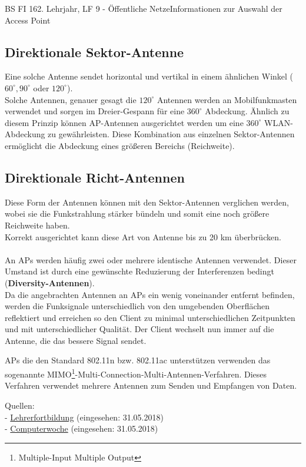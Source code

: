 \documentclass[11pt,twocolumn,oneside,openany,headings=optiontotoc,11pt,numbers=noenddot]{article}
\begin{document}
\begin{worksheet}{BS FI 16}{2. Lehrjahr, LF 9 - Öffentliche Netze}{Informationen zur Auswahl der Access Point}
		\subsection*{Direktionale Sektor-Antenne} Eine solche Antenne sendet horizontal und vertikal in einem ähnlichen Winkel (\(60^\circ, 90^\circ\) oder \(120^\circ\)).\\
		Solche Antennen, genauer gesagt die \(120^\circ\) Antennen werden an Mobilfunkmasten verwendet und sorgen im Dreier-Gespann für eine \(360^\circ\) Abdeckung. Ähnlich zu diesem Prinzip können AP-Antennen ausgerichtet werden um eine \(360^\circ\) WLAN-Abdeckung zu gewährleisten. Diese Kombination aus einzelnen Sektor-Antennen ermöglicht die Abdeckung eines größeren Bereichs (Reichweite).
		\subsection*{Direktionale Richt-Antennen} Diese Form der Antennen können mit den Sektor-Antennen verglichen werden, wobei sie die Funkstrahlung stärker bündeln und somit eine noch größere Reichweite haben.\\
		Korrekt ausgerichtet kann diese Art von Antenne bis zu 20 km überbrücken.\\
		\\
		An APs werden häufig zwei oder mehrere identische Antennen verwendet. Dieser Umstand ist durch eine gewünschte Reduzierung der Interferenzen bedingt (\textbf{Diversity-Antennen}).\\
		Da die angebrachten Antennen an APs ein wenig voneinander entfernt befinden, werden die Funksignale unterschiedlich von den umgebenden Oberflächen reflektiert und erreichen so den Client zu minimal unterschiedlichen Zeitpunkten und mit unterschiedlicher Qualität. Der Client wechselt nun immer auf die Antenne, die das bessere Signal sendet.\\
		\par\noindent
		APs die den Standard 802.11n bzw. 802.11ac unterstützen verwenden das sogenannte MIMO\footnote{Multiple-Input Multiple Output}-Multi-Connection-Multi-Antennen-Verfahren. Dieses Verfahren verwendet mehrere Antennen zum Senden und Empfangen von Daten.
		\par\bigskip\noindent
		\tiny{Quellen:\\
			- \href{https://lehrerfortbildung-bw.de/st_digital/tablet/anleitungen/infrastruktur/wlan/ap-auswahl.html}{Lehrerfortbildung} (eingesehen: 31.05.2018)\\
			- \href{https://www.computerwoche.de/a/wlan-ratgeber-antennen-richtig-waehlen-und-positionieren,3060831}{Computerwoche} (eingesehen: 31.05.2018)}
	\end{worksheet}
\end{document}
